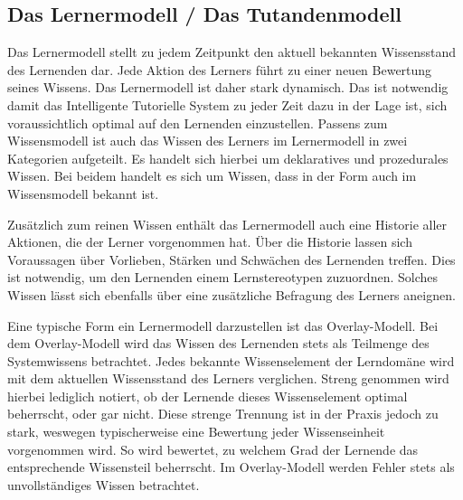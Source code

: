 \subsection{Das Lernermodell / Das Tutandenmodell}
Das Lernermodell stellt zu jedem Zeitpunkt den aktuell bekannten Wissensstand des Lernenden dar.
Jede Aktion des Lerners führt zu einer neuen Bewertung seines Wissens. Das Lernermodell ist daher stark dynamisch.
Das ist notwendig damit das Intelligente Tutorielle System zu jeder Zeit dazu in der Lage ist, sich voraussichtlich optimal
auf den Lernenden einzustellen.
Passens zum Wissensmodell ist auch das Wissen des Lerners im Lernermodell in zwei Kategorien aufgeteilt.
Es handelt sich hierbei um deklaratives und prozedurales Wissen. Bei beidem handelt es sich um Wissen, dass
in der Form auch im Wissensmodell bekannt ist.

Zusätzlich zum reinen Wissen enthält das Lernermodell auch eine
Historie aller Aktionen, die der Lerner vorgenommen hat. Über die Historie lassen sich Voraussagen über Vorlieben, Stärken
und Schwächen des Lernenden treffen. Dies ist notwendig, um den Lernenden einem Lernstereotypen zuzuordnen.
Solches Wissen lässt sich ebenfalls über eine zusätzliche Befragung des Lerners aneignen.

Eine typische Form ein Lernermodell darzustellen ist das Overlay-Modell.
Bei dem Overlay-Modell wird das Wissen des Lernenden stets als Teilmenge des Systemwissens betrachtet.
Jedes bekannte Wissenselement der Lerndomäne wird mit dem aktuellen Wissensstand des Lerners verglichen.
Streng genommen wird hierbei lediglich notiert, ob der Lernende dieses Wissenselement optimal beherrscht, oder gar nicht.
Diese strenge Trennung ist in der Praxis jedoch zu stark, weswegen typischerweise eine Bewertung jeder Wissenseinheit vorgenommen wird.
So wird bewertet, zu welchem Grad der Lernende das entsprechende Wissensteil beherrscht.
Im Overlay-Modell werden Fehler stets als unvollständiges Wissen betrachtet.

